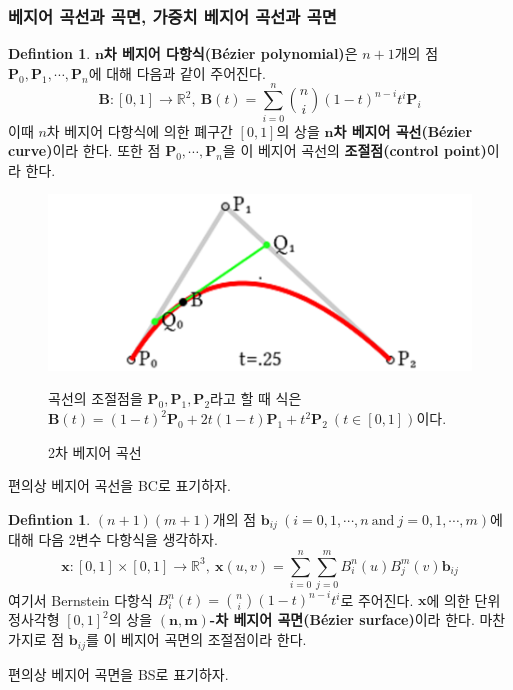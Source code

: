 \documentclass{gshs_thesis}
\theoremstyle{theorem}
\theoremstyle{lemma}
\theoremstyle{definition}
\newtheorem{definition}[theorem]{Defintion}
\begin{document}
\subsubsection{베지어 곡선과 곡면, 가중치 베지어 곡선과 곡면}
\begin{definition} \label{BC}
	\textbf{$\boldsymbol{n}$차 베지어 다항식(Bézier polynomial)}은 $n+1$개의 점 $\mathbf{P}_0, \mathbf{P}_1, \cdots, \mathbf{P}_n$에 대해 다음과 같이 주어진다.
	\begin{equation}
		\mathbf{B}:[0,1] \rightarrow \mathbb{R}^{2}, \ \mathbf{B}(t)=\sum_{i=0}^n \binom ni(1-t)^{n-i}t^i\mathbf{P}_i
	\end{equation}
	이때 $n$차 베지어 다항식에 의한 폐구간 $[0, 1]$의 상을 \textbf{$\boldsymbol{n}$차 베지어 곡선(Bézier curve)}이라 한다. 또한 점 $\mathbf{P}_0, \cdots, \mathbf{P}_n$을 이 베지어 곡선의 \textbf{조절점(control point)}이라 한다. 
\end{definition}
\begin{figure}[h]
	\centering
	\includegraphics[width=.4\textwidth]{image/BC_model}
	\caption{2차 베지어 곡선}
	\small   
	\raggedright
	곡선의 조절점을 $\textbf{P}_{0},\textbf{P}_{1},\textbf{P}_{2}$라고 할 때 식은 $\textbf{B}(t)=(1-t)^{2}\textbf{P}_{0}+2t(1-t)\textbf{P}_{1}+t^{2}\textbf{P}_{2} \  (t\in{[0,1]})$이다.
\end{figure}
편의상 베지어 곡선을 BC로 표기하자.
\begin{definition} \label{BS}
	$(n+1)(m+1)$개의 점 $\mathbf{b}_{ij}\ (i=0, 1, \cdots, n\ \mathrm{and}\ j=0, 1, \cdots, m)$에 대해 다음 $2$변수 다항식을 생각하자. 
	\begin{equation}\label{BezierSurface}
		\mathbf{x}:[0,1]\times[0,1] \rightarrow \mathbb{R}^{3}, \  \mathbf{x}(u, v)=\sum_{i=0}^n\sum_{j=0}^m B_i^n(u)B_j^m(v)\mathbf{b}_{ij} 
	\end{equation}
	여기서 Bernstein 다항식 $B_i^n(t)=\binom ni(1-t)^{n-i}t^i$로 주어진다. $\mathbf{x}$에 의한 단위 정사각형 $[0, 1]^2$의 상을 \textbf{$\boldsymbol{(n, m)}$-차 베지어 곡면(Bézier surface)}이라 한다. 마찬가지로 점 $\mathbf{b}_{ij}$를 이 베지어 곡면의 조절점이라 한다.\cite{Farin}
\end{definition}
편의상 베지어 곡면을 BS로 표기하자.
\end{document}
